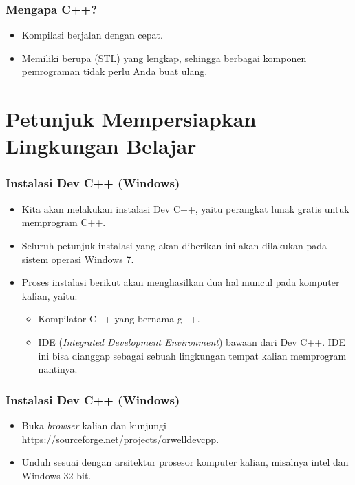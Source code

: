 \begin{frame}
\frametitle{Mengapa C++?}
\begin{itemize}
  \item Kompilasi berjalan dengan cepat.
  \item Memiliki  berupa  (STL) yang lengkap, sehingga berbagai komponen pemrograman tidak perlu Anda buat ulang.
\end{itemize}
\end{frame}

\section{Petunjuk Mempersiapkan \newline Lingkungan Belajar}
\frame{\sectionpage}

\begin{frame}
\frametitle{Instalasi Dev C++ (Windows)}
\begin{itemize}
  \item Kita akan melakukan instalasi Dev C++, yaitu perangkat lunak gratis untuk memprogram C++.
  \item Seluruh petunjuk instalasi yang akan diberikan ini akan dilakukan pada sistem operasi Windows 7.
  \item Proses instalasi berikut akan menghasilkan dua hal muncul pada komputer kalian, yaitu:
  \begin{itemize}
    \item Kompilator C++ yang bernama g++.
    \item IDE (\textit{Integrated Development Environment}) bawaan dari Dev C++. IDE ini bisa dianggap sebagai sebuah lingkungan tempat kalian memprogram nantinya.
  \end{itemize}
\end{itemize}
\end{frame}

\begin{frame}
\frametitle{Instalasi Dev C++ (Windows)}
\begin{itemize}
  \item Buka \textit{browser} kalian dan kunjungi \href{https://sourceforge.net/projects/orwelldevcpp}{https://sourceforge.net/projects/orwelldevcpp}.
  \item Unduh sesuai dengan arsitektur prosesor komputer kalian, misalnya intel dan Windows 32 bit.
\end{itemize}
\end{frame}

